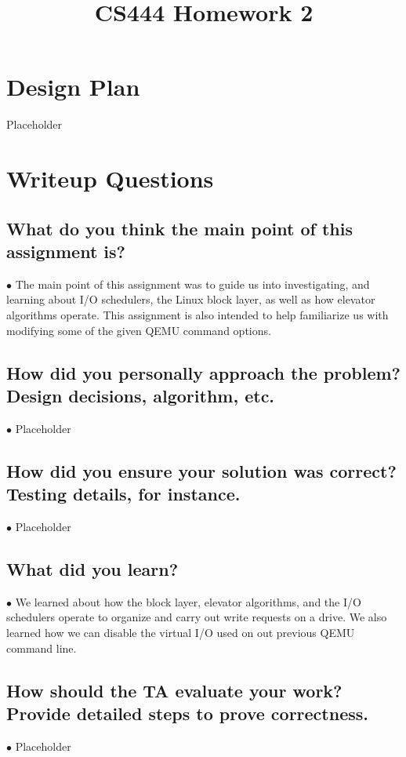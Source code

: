 \documentclass[letterpaper,10pt,fleqn,draftclsnofoot,onecolumn]{IEEEtran}
\title{CS444 Homework 2}
\author{\name}
\begin{document}
	\maketitle
	\hrulefill
	\section*{Design Plan}
	Placeholder
	
	\section*{Writeup Questions}
	
	\subsection{What do you think the main point of this assignment is?}
	$\bullet$ The main point of this assignment was to guide us into investigating, and learning about I/O schedulers, the Linux block layer, as well as how elevator algorithms operate. This assignment is also intended to help familiarize us with modifying some of the given QEMU command options.
	
	\subsection{How did you personally approach the problem? Design decisions, algorithm, etc.}
	$\bullet$ Placeholder
	
	
	\subsection{How did you ensure your solution was correct? Testing details, for instance.}
	$\bullet$ Placeholder
	
	\subsection{What did you learn?}
	$\bullet$ We learned about how the block layer, elevator algorithms, and the I/O schedulers operate to organize and carry out write requests on a drive. We also learned how we can disable the virtual I/O used on out previous QEMU command line.
	
	\subsection{How should the TA evaluate your work? Provide detailed steps to prove correctness.}
	$\bullet$ Placeholder
	 
\end{document}

